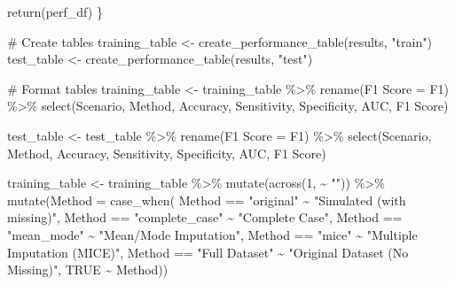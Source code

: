 \documentclass[
  letterpaper,
  DIV=11,
  numbers=noendperiod]{scrartcl}
\newenvironment{Shaded}{\begin{snugshade}}{\end{snugshade}}
\newcommand{\AttributeTok}[1]{\textcolor[rgb]{0.40,0.45,0.13}{#1}}
\newcommand{\CommentTok}[1]{\textcolor[rgb]{0.37,0.37,0.37}{#1}}
\newcommand{\ConstantTok}[1]{\textcolor[rgb]{0.56,0.35,0.01}{#1}}
\newcommand{\DecValTok}[1]{\textcolor[rgb]{0.68,0.00,0.00}{#1}}
\newcommand{\FunctionTok}[1]{\textcolor[rgb]{0.28,0.35,0.67}{#1}}
\newcommand{\NormalTok}[1]{\textcolor[rgb]{0.00,0.23,0.31}{#1}}
\newcommand{\OtherTok}[1]{\textcolor[rgb]{0.00,0.23,0.31}{#1}}
\newcommand{\SpecialCharTok}[1]{\textcolor[rgb]{0.37,0.37,0.37}{#1}}
\newcommand{\StringTok}[1]{\textcolor[rgb]{0.13,0.47,0.30}{#1}}
\begin{document}
\begin{Shaded}
\begin{Highlighting}[]
  \FunctionTok{return}\NormalTok{(perf\_df)}
\NormalTok{\}}

\CommentTok{\# Create tables}
\NormalTok{training\_table }\OtherTok{\textless{}{-}} \FunctionTok{create\_performance\_table}\NormalTok{(results, }\StringTok{"train"}\NormalTok{)}
\NormalTok{test\_table }\OtherTok{\textless{}{-}} \FunctionTok{create\_performance\_table}\NormalTok{(results, }\StringTok{"test"}\NormalTok{)}

\CommentTok{\# Format tables}
\NormalTok{training\_table }\OtherTok{\textless{}{-}}\NormalTok{ training\_table }\SpecialCharTok{\%\textgreater{}\%}
  \FunctionTok{rename}\NormalTok{(}\StringTok{\textasciigrave{}}\AttributeTok{F1 Score}\StringTok{\textasciigrave{}} \OtherTok{=}\NormalTok{ F1) }\SpecialCharTok{\%\textgreater{}\%}
  \FunctionTok{select}\NormalTok{(Scenario, Method, Accuracy, Sensitivity, Specificity, AUC, }\StringTok{\textasciigrave{}}\AttributeTok{F1 Score}\StringTok{\textasciigrave{}}\NormalTok{)}

\NormalTok{test\_table }\OtherTok{\textless{}{-}}\NormalTok{ test\_table }\SpecialCharTok{\%\textgreater{}\%}
  \FunctionTok{rename}\NormalTok{(}\StringTok{\textasciigrave{}}\AttributeTok{F1 Score}\StringTok{\textasciigrave{}} \OtherTok{=}\NormalTok{ F1) }\SpecialCharTok{\%\textgreater{}\%}
  \FunctionTok{select}\NormalTok{(Scenario, Method, Accuracy, Sensitivity, Specificity, AUC, }\StringTok{\textasciigrave{}}\AttributeTok{F1 Score}\StringTok{\textasciigrave{}}\NormalTok{)}

\NormalTok{training\_table }\OtherTok{\textless{}{-}}\NormalTok{ training\_table }\SpecialCharTok{\%\textgreater{}\%}  
  \FunctionTok{mutate}\NormalTok{(}\FunctionTok{across}\NormalTok{(}\DecValTok{1}\NormalTok{, }\SpecialCharTok{\textasciitilde{}} \StringTok{""}\NormalTok{)) }\SpecialCharTok{\%\textgreater{}\%}
  \FunctionTok{mutate}\NormalTok{(}\AttributeTok{Method =} \FunctionTok{case\_when}\NormalTok{(}
\NormalTok{      Method }\SpecialCharTok{==} \StringTok{"original"} \SpecialCharTok{\textasciitilde{}} \StringTok{"Simulated (with missing)"}\NormalTok{,}
\NormalTok{      Method }\SpecialCharTok{==} \StringTok{"complete\_case"} \SpecialCharTok{\textasciitilde{}} \StringTok{"Complete Case"}\NormalTok{,}
\NormalTok{      Method }\SpecialCharTok{==} \StringTok{"mean\_mode"} \SpecialCharTok{\textasciitilde{}} \StringTok{"Mean/Mode Imputation"}\NormalTok{,}
\NormalTok{      Method }\SpecialCharTok{==} \StringTok{"mice"} \SpecialCharTok{\textasciitilde{}} \StringTok{"Multiple Imputation (MICE)"}\NormalTok{,}
\NormalTok{      Method }\SpecialCharTok{==} \StringTok{"Full Dataset"} \SpecialCharTok{\textasciitilde{}} \StringTok{"Original Dataset (No Missing)"}\NormalTok{,}
      \ConstantTok{TRUE} \SpecialCharTok{\textasciitilde{}}\NormalTok{ Method))}


\end{Highlighting}
\end{Shaded}
\end{document}

